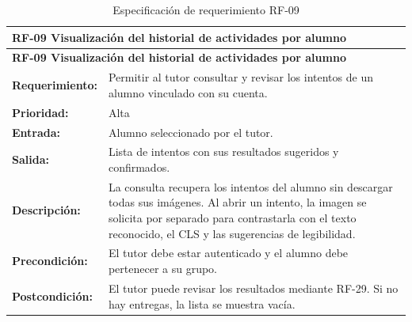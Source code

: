 \begin{longtable}{|p{3.2cm}|p{11.8cm}|}
\caption{Especificación de requerimiento RF-09}\label{tab:rf09} \\ \hline
\multicolumn{2}{|p{15cm}|}{\textbf{RF-09 Visualización del historial de actividades por alumno}} \\ \hline
\endfirsthead
\hline
\multicolumn{2}{|p{15cm}|}{\textbf{RF-09 Visualización del historial de actividades por alumno}} \\ \hline
\endhead
\textbf{Requerimiento:} & Permitir al tutor consultar y revisar los intentos de un alumno vinculado con su cuenta. \\ \hline
\textbf{Prioridad:} & Alta \\ \hline
\textbf{Entrada:} & Alumno seleccionado por el tutor. \\ \hline
\textbf{Salida:} & Lista de intentos con sus resultados sugeridos y confirmados. \\ \hline
\textbf{Descripción:} & La consulta recupera los intentos del alumno sin descargar todas sus imágenes. Al abrir un intento, la imagen se solicita por separado para contrastarla con el texto reconocido, el CLS y las sugerencias de legibilidad. \\ \hline
\textbf{Precondición:} & El tutor debe estar autenticado y el alumno debe pertenecer a su grupo. \\ \hline
\textbf{Postcondición:} & El tutor puede revisar los resultados mediante RF-29. Si no hay entregas, la lista se muestra vacía. \\ \hline
\end{longtable}


